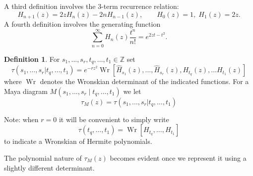 \documentclass{amsart}
\theoremstyle{definition}
\newtheorem{definition}{Definition}
\newcommand{\Wr}{\operatorname{Wr}}
\newcommand{\Z}{\mathbb{Z}}
\newcommand{\hh}{\hat{H}}
\renewcommand{\th}{\tilde{H}}
\newcommand{\h}{H}
\begin{document}
A third definition involves
the 3-term recurrence relation:
\[  H_{n+1}(z) = 2z H_n(z) -2n H_{n-1}(z),\qquad H_0(z) =1,\; H_1(z)= 2z.\]
A fourth definition involves the generating function
\begin{equation}
  \label{eq:hermgf}
  \sum_{n=0}^\infty H_n(z) \frac{t^n}{n!} =  e^{2zt-t^2}.
\end{equation}


\begin{definition}
  For $s_1,\dots,s_r,t_q,\dots,t_1\in \Z$ set
  \begin{equation}
    \label{eq:taudef}
    \tau(s_1,\ldots, s_r| t_q,\ldots, t_1) = e^{-rz^2}\Wr[
    \hh_{s_1}(z),\ldots, \hh_{s_r}(z), \h_{t_q}(z),\ldots \h_{t_1}(z) ]
  \end{equation}
  where $\Wr$ denotes the Wronskian determinant of the indicated
  functions.  For a Maya diagram $M(s_1,\dots,s_r\mid t_q,\dots,t_1)$
  we let
  \begin{equation}
    \label{eq:pWdef1} \tau_M(z)  =     \tau(s_1,\ldots, s_r|
    t_q,\ldots, t_1)  \end{equation} 
\end{definition}
\noindent
Note: when $r=0$ it will be convenient  to simply write
\begin{equation}
  \label{eq:tauWr}
  \tau(t_q,\ldots, t_1) = \Wr[H_{t_q},\ldots,H_{t_1}] 
\end{equation}
to indicate a Wronskian of Hermite polynomials.

The polynomial nature of $\tau_M(z)$ becomes evident once we represent
it using a slightly different determinant.
\end{document}
